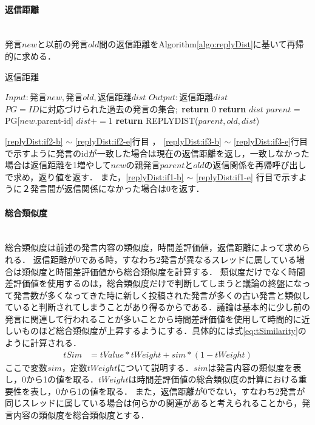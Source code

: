 \paragraph{返信距離}\ \\
発言$new$と以前の発言$old$間の返信距離をAlgorithm\ref{algo:replyDist}に基いて再帰的に求める．
\begin{algorithm}
\caption{返信距離} \label{algo:replyDist}
\begin{algorithmic}[1]
\State $Input:  発言new,発言old,返信距離dist$ 
\State $Output: 返信距離dist$
\State $PG = IDに対応づけられた過去の発言の集合;$%
	\label{replyDist:if1-b}
		\State \textbf{return} 0\label{replyDist:if1-e}
	\label{replyDist:if2-b}
		\State \textbf{return} $dist$\label{replyDist:if2-e}
	 \Else\label{replyDist:if3-b}
	 	\State $parent$ = PG[$new$.parent-id]
		\State $dist+=1$
		\State \textbf{return} REPLYDIST($parent,old,dist$)\label{replyDist:if3-e}
	\EndIf
\EndProcedure
\end{algorithmic}
\end{algorithm}

\ref{replyDist:if2-b} $\sim$ \ref{replyDist:if2-e}行目 ， \ref{replyDist:if3-b} $\sim$ \ref{replyDist:if3-e}行目で示すように発言のidが一致した場合は現在の返信距離を返し，一致しなかった場合は返信距離を1増やして$new$の親発言$parent$と$old$の返信関係を再帰呼び出しで求め，返り値を返す．
また，\ref{replyDist:if1-b} $\sim$ \ref{replyDist:if1-e} 行目で示すように２発言間が返信関係になかった場合は0を返す．

\paragraph{総合類似度}\ \\
総合類似度は前述の発言内容の類似度，時間差評価値，返信距離によって求められる．
返信距離が0である時，すなわち2発言が異なるスレッドに属している場合は類似度と時間差評価値から総合類似度を計算する．
類似度だけでなく時間差評価値を使用するのは，総合類似度だけで判断してしまうと議論の終盤になって発言数が多くなってきた時に新しく投稿された発言が多くの古い発言と類似していると判断されてしまうことがあり得るからである．議論は基本的に少し前の発言に関連して行われることが多いことから時間差評価値を使用して時間的に近しいものほど総合類似度が上昇するようにする．具体的には式\ref{eq:tSimilarity}のように計算される．
\begin{equation}
\begin{aligned}
\label{eq:tSimilarity}
tSim & = tValue*tWeight + sim*(1-tWeight)
\end{aligned}
\end{equation}
ここで変数$sim$，定数$tWeight$について説明する．$sim$は発言内容の類似度を表し，0から1の値を取る．$tWeight$は時間差評価値の総合類似度の計算における重要性を表し，0から1の値を取る．
また，返信距離が0でない，すなわち2発言が同じスレッドに属している場合は何らかの関連があると考えられることから，発言内容の類似度を総合類似度とする．

